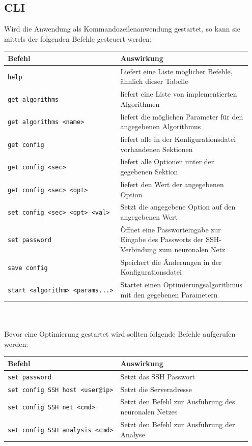 \documentclass[
  a4paper,               %
  twoside,               %
  DIV=12,                %
  BCOR=8mm,              %
  headinclude=true,      %
  footinclude=false,     %
  numbers=noenddot,      %
  headheight=40pt,       %
  11pt]{scrartcl}        %
\begin{document}
\subsection{CLI}
Wird die Anwendung als Kommandozeilenanwendung gestartet, so kann sie mittels der folgenden Befehle gesteuert werden:\\
\begin{tabular}{p{0.4\linewidth}|p{0.55\linewidth}}
	\toprule
	Befehl & Auswirkung\tabularnewline
	\midrule
	\texttt{help} & Liefert eine Liste möglicher Befehle, ähnlich dieser
	Tabelle\tabularnewline
	\texttt{get\ algorithms} & liefert eine Liste von implementierten
		Algorithmen\tabularnewline
	\texttt{get\ algorithms\ \textless{}name\textgreater{}} & liefert die
	möglichen Parameter für den angegebenen Algorithmus\tabularnewline
	\texttt{get\ config} & liefert alle in der Konfigurationsdatei
	vorhandenen Sektionen\tabularnewline
	\texttt{get\ config\ \textless{}sec\textgreater{}} & liefert alle
	Optionen unter der gegebenen Sektion\tabularnewline
	\texttt{get\ config\ \textless{}sec\textgreater{}\ \textless{}opt\textgreater{}}
	& liefert den Wert der angegebenen Option\tabularnewline
	\texttt{set\ config\ \textless{}sec\textgreater{}\ \textless{}opt\textgreater{}\ \textless{}val\textgreater{}}
	& Setzt die angegebene Option auf den angegebenen Wert\tabularnewline
	\texttt{set\ password} & Öffnet eine Passworteingabe zur Eingabe des
	Passworts der SSH-Verbindung zum neuronalen Netz\tabularnewline
	\texttt{save\ config} & Speichert die Änderungen in der
	Konfigurationsdatei\tabularnewline
	\texttt{start\ \textless{}algorithm\textgreater{}\ \textless{}params...\textgreater{}}
	& Startet einen Optimierungsalgorithmus mit den gegebenen
	Parametern\tabularnewline
	\bottomrule
\end{tabular}\\
\newline\\
Bevor eine Optimierung gestartet wird sollten folgende Befehle
aufgerufen werden:\\
\begin{tabular}{p{0.4\linewidth}|p{0.55\linewidth}}
	\toprule
	Befehl & Auswirkung\tabularnewline
	\midrule
	\texttt{set\ password} & Setzt das SSH Passwort\tabularnewline
	\texttt{set\ config\ SSH\ host\ \textless{}user@ip\textgreater{}} & Setzt
	die Serveradresse\tabularnewline
	\texttt{set\ config\ SSH\ net\ \textless{}cmd\textgreater{}} & Setzt
	den Befehl zur Ausführung des neuronalen Netzes\tabularnewline
	\texttt{set\ config\ SSH\ analysis\ \textless{}cmd\textgreater{}} &
	Setzt den Befehl zur Ausführung der Analyse\tabularnewline
	\bottomrule
\end{tabular}\\
\end{document}
